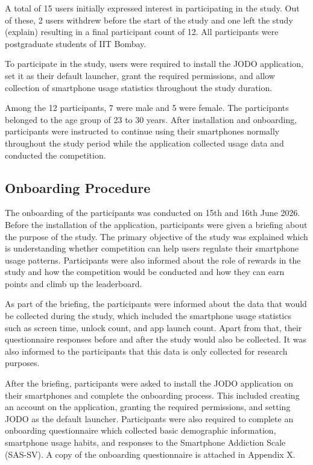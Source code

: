\documentclass[11pt]{report}
\begin{document}
A total of 15 users initially expressed interest in participating in the study. Out of these, 2 users withdrew before the start of the study and one left the study (explain) resulting in a final participant count of 12. 
All participants were postgraduate students of IIT Bombay.

To participate in the study, users were required to install the JODO application, set it as their default launcher, grant the required permissions, and allow collection of smartphone usage statistics throughout the study duration.

Among the 12 participants, 7 were male and 5 were female. The participants belonged to the age group of 23 to 30 years. After installation and onboarding, participants were instructed to continue using their smartphones normally throughout the study period while the application collected usage data and conducted the competition.

\subsection{Onboarding Procedure}

The onboarding of the participants was conducted on 15th and 16th June 2026. 
Before the installation of the application, participants were given a briefing about the purpose of the study. 
The primary objective of the study was explained which is understanding whether competition can help users regulate their smartphone usage patterns. 
Participants were also informed about the role of rewards in the study and how the competition would be conducted and how they can earn points and climb up the leaderboard.

As part of the briefing, the participants were informed about the data that would be collected during the study, which included the smartphone usage statistics such as screen time, unlock count, and app launch count. 
Apart from that, their questionnaire responses before and after the study would also be collected.
It was also informed to the participants that this data is only collected for research purposes.

After the briefing, participants were asked to install the JODO application on their smartphones and complete the onboarding process. 
This included creating an account on the application, granting the required permissions, and setting JODO as the default launcher. 
Participants were also required to complete an onboarding questionnaire which collected basic demographic information, smartphone usage habits, and responses to the Smartphone Addiction Scale (SAS-SV). A copy of the onboarding questionnaire is attached in Appendix X.
\end{document}
